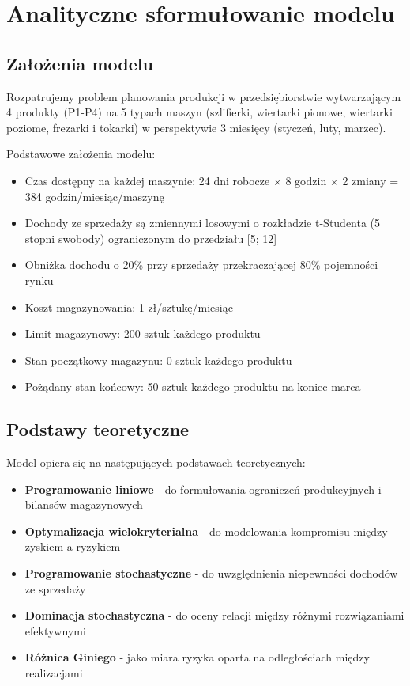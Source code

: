 \section{Analityczne sformułowanie modelu}

\subsection{Założenia modelu}

Rozpatrujemy problem planowania produkcji w przedsiębiorstwie wytwarzającym 4 produkty (P1-P4) na 5 typach maszyn (szlifierki, wiertarki pionowe, wiertarki poziome, frezarki i tokarki) w perspektywie 3 miesięcy (styczeń, luty, marzec).

Podstawowe założenia modelu:
\begin{itemize}
  \item Czas dostępny na każdej maszynie: 24 dni robocze $\times$ 8 godzin $\times$ 2 zmiany = 384 godzin/miesiąc/maszynę
  \item Dochody ze sprzedaży są zmiennymi losowymi o rozkładzie t-Studenta (5 stopni swobody) ograniczonym do przedziału [5; 12]
  \item Obniżka dochodu o 20\% przy sprzedaży przekraczającej 80\% pojemności rynku
  \item Koszt magazynowania: 1 zł/sztukę/miesiąc
  \item Limit magazynowy: 200 sztuk każdego produktu
  \item Stan początkowy magazynu: 0 sztuk każdego produktu
  \item Pożądany stan końcowy: 50 sztuk każdego produktu na koniec marca
\end{itemize}

\subsection{Podstawy teoretyczne}

Model opiera się na następujących podstawach teoretycznych:
\begin{itemize}
  \item \textbf{Programowanie liniowe} - do formułowania ograniczeń produkcyjnych i bilansów magazynowych
  \item \textbf{Optymalizacja wielokryterialna} - do modelowania kompromisu między zyskiem a ryzykiem
  \item \textbf{Programowanie stochastyczne} - do uwzględnienia niepewności dochodów ze sprzedaży
  \item \textbf{Dominacja stochastyczna} - do oceny relacji między różnymi rozwiązaniami efektywnymi
  \item \textbf{Różnica Giniego} - jako miara ryzyka oparta na odległościach między realizacjami
\end{itemize}

